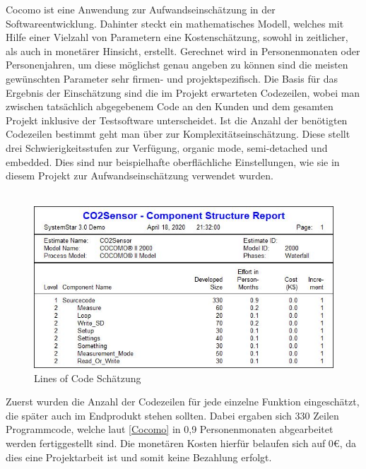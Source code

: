 \label{Cocomo}
Cocomo ist eine Anwendung zur Aufwandseinschätzung in der Softwareentwicklung. Dahinter steckt ein mathematisches Modell, welches mit Hilfe einer Vielzahl von  Parametern eine Kostenschätzung, sowohl in zeitlicher, als auch in monetärer Hinsicht, erstellt. Gerechnet wird in Personenmonaten oder Personenjahren, um diese möglichst genau angeben zu können sind die meisten gewünschten Parameter sehr firmen- und projektspezifisch. Die Basis für das Ergebnis der Einschätzung sind die im Projekt erwarteten Codezeilen, wobei man zwischen tatsächlich abgegebenem Code an den Kunden und dem gesamten Projekt inklusive der Testsoftware unterscheidet. Ist die Anzahl der benötigten Codezeilen bestimmt geht man über zur Komplexitätseinschätzung. Diese stellt drei Schwierigkeitsstufen zur Verfügung, organic mode, semi-detached und embedded. Dies sind nur beispielhafte oberflächliche Einstellungen, wie sie in diesem Projekt zur Aufwandseinschätzung 
verwendet wurden. \\ \\

\begin{figure}[!hbt]
	\centering
	\includegraphics[width=0.9\linewidth]{Images/CocomoSchaetzung}
	\caption{Lines of Code Schätzung}
	\label{fig:Cocomo}
\end{figure}

Zuerst wurden die Anzahl der Codezeilen für jede einzelne Funktion eingeschätzt, die später auch im Endprodukt stehen sollten. Dabei ergaben sich 330 Zeilen Programmcode, welche laut \ref{Cocomo} in 0,9 Personenmonaten abgearbeitet werden fertiggestellt sind. Die monetären Kosten hierfür belaufen sich auf 0€, da dies eine Projektarbeit ist und somit keine Bezahlung erfolgt.